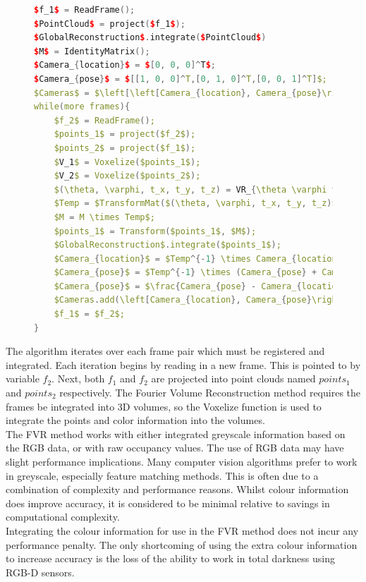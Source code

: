 \begin{figure}
\begin{lstlisting}[language=c++,caption=Phase Correlation Based SLAM Algorithm,label=algorithm:PCSLAMNo1,mathescape,basicstyle=\ttfamily]
$f_1$ = ReadFrame();
$PointCloud$ = project($f_1$);
$GlobalReconstruction$.integrate($PointCloud$)
$M$ = IdentityMatrix();
$Camera_{location}$ = $[0, 0, 0]^T$;
$Camera_{pose}$ = $[[1, 0, 0]^T,[0, 1, 0]^T,[0, 0, 1]^T]$;
$Cameras$ = $\left[\left[Camera_{location}, Camera_{pose}\right] \right]$;
while(more frames){
	$f_2$ = ReadFrame();
	$points_1$ = project($f_2$);
	$points_2$ = project($f_1$);
	$V_1$ = Voxelize($points_1$);
	$V_2$ = Voxelize($points_2$);
	$(\theta, \varphi, t_x, t_y, t_z) = VR_{\theta \varphi t_x t_y t_z}(V_1, V_2)$;
	$Temp = $TransformMat($(\theta, \varphi, t_x, t_y, t_z)$);
	$M = M \times Temp$;
	$points_1$ = Transform($points_1$, $M$);
	$GlobalReconstruction$.integrate($points_1$);
	$Camera_{location}$ = $Temp^{-1} \times Camera_{location}$;
	$Camera_{pose}$ = $Temp^{-1} \times (Camera_{pose} + Camera_{location})$;
	$Camera_{pose}$ = $\frac{Camera_{pose} - Camera_{location}}{Camera_{pose} - Camera_{location}}$;
	$Cameras.add(\left[Camera_{location}, Camera_{pose}\right])$;
	$f_1$ = $f_2$;
}
\end{lstlisting}
\end{figure}

The algorithm iterates over each frame pair which must be registered and integrated. Each iteration begins by reading in a new frame. This is pointed to by variable $f_2$. Next, both $f_1$ and $f_2$ are projected into point clouds named $points_1$ and $points_2$ respectively. The Fourier Volume Reconstruction method requires the frames be integrated into 3D volumes, so the Voxelize function is used to integrate the points and color information into the volumes. \\

The FVR method works with either integrated greyscale information based on the RGB data, or with raw occupancy values. The use of RGB data may have slight performance implications. Many computer vision algorithms prefer to work in greyscale, especially feature matching methods. This is often due to a combination of complexity and performance reasons. Whilst colour information does improve accuracy, it is considered to be minimal relative to savings in computational complexity. \\

Integrating the colour information for use in the FVR method does not incur any performance penalty. The only shortcoming of using the extra colour information to increase accuracy is the loss of the ability to work in total darkness using RGB-D sensors. \\

